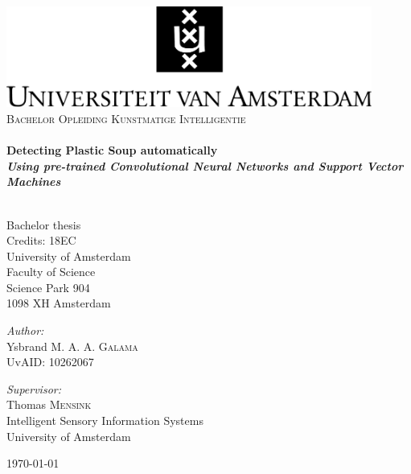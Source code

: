 \begin{titlepage}
\begin{center}
\includegraphics[width=0.9\textwidth]{images/uva-campus.pdf}\\[0.5cm]


\textsc{\large Bachelor Opleiding Kunstmatige Intelligentie}\\[1cm]

\HRule \\[0.4cm]
{\bfseries { \huge Detecting Plastic Soup automatically
} \\[0.2cm]
{\it \Large  Using pre-trained Convolutional Neural Networks and Support Vector Machines}
\\[0.4cm] }

\HRule \\[1cm]

Bachelor thesis\\
Credits: 18EC\\[0.5cm]
University of Amsterdam\\
Faculty of Science\\
Science Park 904\\
1098 XH Amsterdam\\[0.5cm]

\vfill

\begin{minipage}[t]{0.4\textwidth}
\begin{flushleft}
\emph{Author:}\\
Ysbrand M. A. A. \textsc{Galama}\\
\small UvAID: 10262067
\end{flushleft}
\end{minipage}
\begin{minipage}[t]{0.5\textwidth}
\begin{flushright}
\emph{Supervisor:} \\
Thomas \textsc{Mensink}\\[0.4cm]
\small Intelligent Sensory Information Systems\\
University of Amsterdam\\
\end{flushright}
\end{minipage}
\vfill

{\large \today}

\end{center}
\end{titlepage}